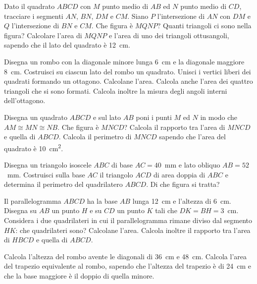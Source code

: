 \begin{multicols}{2}
\begin{esercizio}
\label{ese:7.42}
Dato il quadrato \(ABCD\) con \(M\) punto medio di \(AB\) ed \(N\) punto 
medio di \(CD\), tracciare i segmenti \(AN\), \(BN\), \(DM\) e \(CM\). Siano 
\(P\) l'intersezione di \(AN\) con \(DM\) e \(Q\) l'intersezione di \(BN\) e 
\(CM\). Che figura è \(MQNP\)? Quanti triangoli ci sono nella figura? 
Calcolare l'area di \(MQNP\) e l'area di uno dei triangoli ottusangoli, 
sapendo che il lato del quadrato è 12~cm.
\end{esercizio}

\begin{esercizio}
\label{ese:7.43}
Disegna un rombo con la diagonale minore lunga 6~cm e la diagonale 
maggiore 8~cm. Costruisci su ciascun lato del rombo un quadrato. 
Unisci i vertici liberi dei quadrati formando un ottagono. Calcolane 
l'area. Calcola anche l'area dei quattro triangoli che si sono 
formati. Calcola inoltre la misura degli angoli interni dell'ottagono.
\end{esercizio}

\begin{esercizio}
\label{ese:7.44}
Disegna un quadrato \(ABCD\) e sul lato \(AB\) poni i punti \(M\) ed \(N\) in 
modo che \(AM\cong MN\cong NB\). Che figura è \(MNCD\)? Calcola il 
rapporto tra l'area di \(MNCD\) e quella di \(ABCD\). Calcola il 
perimetro di \(MNCD\) sapendo che l'area del quadrato è 
10~cm\textsuperscript{2}.
\end{esercizio}

\begin{esercizio}
\label{ese:7.45}
Disegna un triangolo isoscele \(ABC\) di base \(AC=40\)~mm e lato obliquo 
\(AB=52\)~mm. Costruisci sulla base \(AC\) il triangolo \(ACD\) di area 
doppia di \(ABC\) e determina il perimetro del quadrilatero \(ABCD\). Di 
che figura si tratta?
\end{esercizio}

\begin{esercizio}
\label{ese:7.46}
Il parallelogramma \(ABCD\) ha la base \(AB\) lunga 12~cm e l'altezza di 
6~cm. Disegna su \(AB\) un punto \(H\) e su \(CD\) un punto \(K\) tali che 
\(DK=BH=3\)~cm. Considera i due quadrilateri in cui il parallelogramma 
rimane diviso dal segmento \(HK\): che quadrilateri sono? Calcolane 
l'area. Calcola inoltre il rapporto tra l'area di \(HBCD\) e quella di 
\(ABCD\).
\end{esercizio}

\begin{esercizio}
\label{ese:7.47}
Calcola l'altezza del rombo avente le diagonali di 36~cm e 48~cm. 
Calcola l'area del trapezio equivalente al rombo, sapendo che 
l'altezza del trapezio è di 24~cm e che la base maggiore è il doppio 
di quella minore.
\end{esercizio}


\end{multicols}
